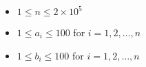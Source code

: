 \begin{itemize}
\tightlist
\item $1 \leq n \leq 2 \times 10^5$
\item $1 \leq a_i \leq 100$ for $i = 1, 2, \ldots, n$
\item $1 \leq b_i \leq 100$ for $i = 1, 2, \ldots, n$
\end{itemize}
